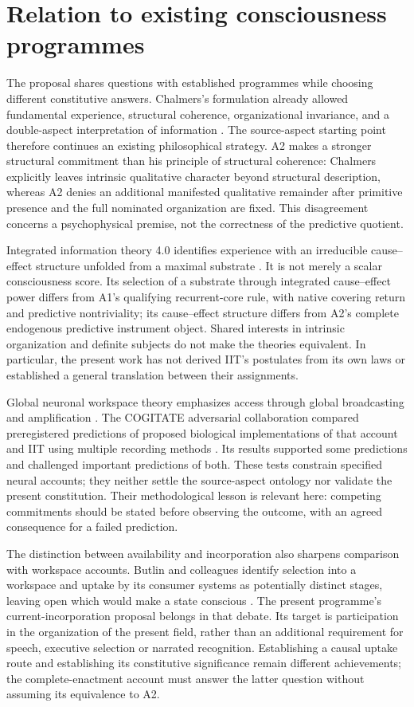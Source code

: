 \section{Relation to existing consciousness programmes}\label{sec:theory-comparison}
The proposal shares questions with established programmes while choosing different constitutive answers. Chalmers's formulation already allowed fundamental experience, structural coherence, organizational invariance, and a double-aspect interpretation of information \cite{Chalmers1995}. The source-aspect starting point therefore continues an existing philosophical strategy. A2 makes a stronger structural commitment than his principle of structural coherence: Chalmers explicitly leaves intrinsic qualitative character beyond structural description, whereas A2 denies an additional manifested qualitative remainder after primitive presence and the full nominated organization are fixed. This disagreement concerns a psychophysical premise, not the correctness of the predictive quotient.

Integrated information theory 4.0 identifies experience with an irreducible cause--effect structure unfolded from a maximal substrate \cite{Albantakis2023}. It is not merely a scalar consciousness score. Its selection of a substrate through integrated cause--effect power differs from A1's qualifying recurrent-core rule, with native covering return and predictive nontriviality; its cause--effect structure differs from A2's complete endogenous predictive instrument object. Shared interests in intrinsic organization and definite subjects do not make the theories equivalent. In particular, the present work has not derived IIT's postulates from its own laws or established a general translation between their assignments.

Global neuronal workspace theory emphasizes access through global broadcasting and amplification \cite{Dehaene2011}. The COGITATE adversarial collaboration compared preregistered predictions of proposed biological implementations of that account and IIT using multiple recording methods \cite{Cogitate2025}. Its results supported some predictions and challenged important predictions of both. These tests constrain specified neural accounts; they neither settle the source-aspect ontology nor validate the present constitution. Their methodological lesson is relevant here: competing commitments should be stated before observing the outcome, with an agreed consequence for a failed prediction.

The distinction between availability and incorporation also sharpens comparison with workspace accounts. Butlin and colleagues identify selection into a workspace and uptake by its consumer systems as potentially distinct stages, leaving open which would make a state conscious \cite[Section~2.2.3, p.~25]{Butlin2023}. The present programme's current-incorporation proposal belongs in that debate. Its target is participation in the organization of the present field, rather than an additional requirement for speech, executive selection or narrated recognition. Establishing a causal uptake route and establishing its constitutive significance remain different achievements; the complete-enactment account must answer the latter question without assuming its equivalence to A2.

